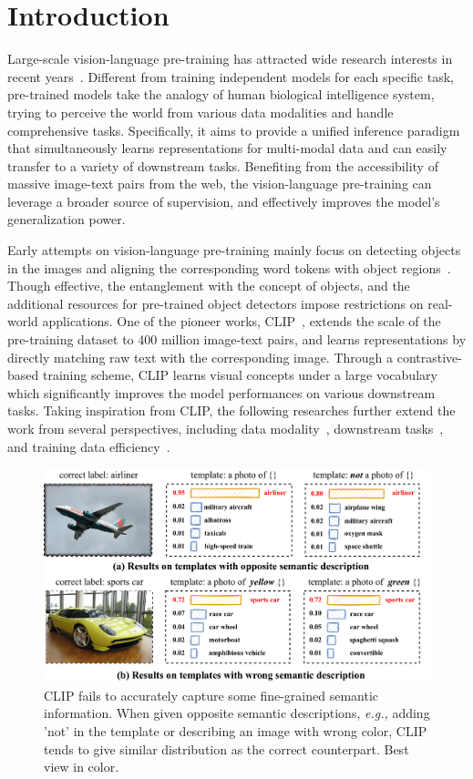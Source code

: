 \section{Introduction}

\label{sec:intro}
Large-scale vision-language pre-training has attracted wide research interests in recent years~\cite{uniter, albef, clip, uniperceiver}. Different from training independent models for each specific task, pre-trained models take the analogy of human biological intelligence system, trying to perceive the world from various data modalities and handle comprehensive tasks. Specifically, it aims to provide a unified inference paradigm that simultaneously learns representations for multi-modal data and can easily transfer to a variety of downstream tasks. Benefiting from the accessibility of massive image-text pairs from the web, the vision-language pre-training can leverage a broader source of supervision, and effectively improves the model's generalization power.

Early attempts on vision-language pre-training mainly focus on detecting objects in the images and aligning the corresponding word tokens with object regions~\cite{uniter,oscar,lxmert}. Though effective, the entanglement with the concept of objects, and the additional resources for pre-trained object detectors impose restrictions on real-world applications. One of the pioneer works, CLIP~\cite{clip}, extends the scale of the pre-training dataset to 400 million image-text pairs, and learns representations by directly matching raw text with the corresponding image. Through a contrastive-based training scheme, CLIP learns visual concepts under a large vocabulary which significantly improves the model performances on various downstream tasks. Taking inspiration from CLIP, the following researches further extend the work from several perspectives, including data modality~\cite{uniperceiver}, downstream tasks~\cite{ofa}, and training data efficiency~\cite{clipnoise, cliplite}.

\begin{figure}[t]
  \centering
  \includegraphics[width=1.0\linewidth]{1_3.pdf}
  \vskip -0.1in
  \caption{CLIP fails to accurately capture some fine-grained semantic information. When given opposite semantic descriptions, \textit{e.g.,} adding 'not' in the template or describing an image with wrong color, CLIP tends to give similar distribution as the correct counterpart. Best view in color.}
\vskip -0.1in
\label{fig1}
\end{figure}


